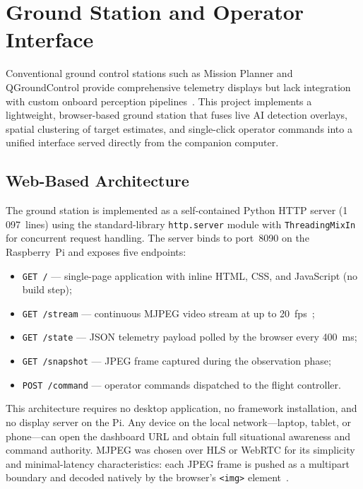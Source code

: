 \section{Ground Station and Operator Interface}\label{sec:groundstation}

Conventional ground control stations such as Mission Planner and QGroundControl provide comprehensive telemetry displays but lack integration with custom onboard perception pipelines~\cite{qgroundcontrol2020,meier2015px4}. This project implements a lightweight, browser-based ground station that fuses live AI detection overlays, spatial clustering of target estimates, and single-click operator commands into a unified interface served directly from the companion computer.

\subsection{Web-Based Architecture}\label{sec:gs-arch}

The ground station is implemented as a self-contained Python HTTP server (1\,097~lines) using the standard-library \texttt{http.server} module with \texttt{ThreadingMixIn} for concurrent request handling. The server binds to port~8090 on the Raspberry~Pi and exposes five endpoints:

\begin{itemize}
  \item \texttt{GET /} --- single-page application with inline HTML, CSS, and JavaScript (no build step);
  \item \texttt{GET /stream} --- continuous MJPEG video stream at up to 20~fps~\cite{rfc2435};
  \item \texttt{GET /state} --- JSON telemetry payload polled by the browser every 400~ms;
  \item \texttt{GET /snapshot} --- JPEG frame captured during the observation phase;
  \item \texttt{POST /command} --- operator commands dispatched to the flight controller.
\end{itemize}

This architecture requires no desktop application, no framework installation, and no display server on the Pi. Any device on the local network---laptop, tablet, or phone---can open the dashboard URL and obtain full situational awareness and command authority. MJPEG was chosen over HLS or WebRTC for its simplicity and minimal-latency characteristics: each JPEG frame is pushed as a multipart boundary and decoded natively by the browser's \texttt{<img>} element~\cite{munoz2016mjpeg}.

